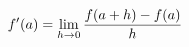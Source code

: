 \documentclass[preview]{standalone}
\begin{document}
\begin{align*}
\special{dvisvgm:raw <g id='unique000'>}f'(a)=\lim_{h\to0}\frac{f(a+h)-f(a)}{h}\special{dvisvgm:raw </g>}
\end{align*}
\end{document}
